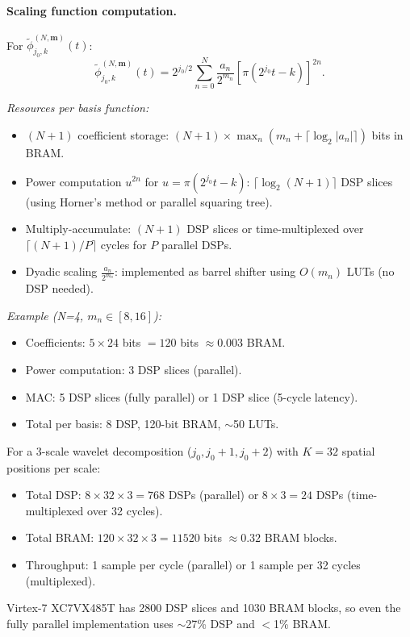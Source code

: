 \paragraph{Scaling function computation.} For $\widetilde{\phi}_{j_0,k}^{(N,\mathbf{m})}(t)$:
\[
\widetilde{\phi}_{j_0,k}^{(N,\mathbf{m})}(t) = 2^{j_0/2} \sum_{n=0}^{N} \frac{a_n}{2^{m_n}} \left[\pi(2^{j_0}t - k)\right]^{2n}.
\]

\emph{Resources per basis function:}
\begin{itemize}
\item $(N+1)$ coefficient storage: $(N+1) \times \max_n(m_n + \lceil \log_2 |a_n| \rceil)$ bits in BRAM.
\item Power computation $u^{2n}$ for $u = \pi(2^{j_0}t - k)$: $\lceil \log_2(N+1) \rceil$ DSP slices (using Horner's method or parallel squaring tree).
\item Multiply-accumulate: $(N+1)$ DSP slices or time-multiplexed over $\lceil (N+1)/P \rceil$ cycles for $P$ parallel DSPs.
\item Dyadic scaling $\frac{a_n}{2^{m_n}}$: implemented as barrel shifter using $O(m_n)$ LUTs (no DSP needed).
\end{itemize}

\emph{Example (N=4, $m_n \in [8, 16]$):}
\begin{itemize}
\item Coefficients: $5 \times 24$ bits $= 120$ bits $\approx 0.003$ BRAM.
\item Power computation: 3 DSP slices (parallel).
\item MAC: 5 DSP slices (fully parallel) or 1 DSP slice (5-cycle latency).
\item Total per basis: 8 DSP, 120-bit BRAM, $\sim$50 LUTs.
\end{itemize}

For a 3-scale wavelet decomposition ($j_0, j_0+1, j_0+2$) with $K=32$ spatial positions per scale:
\begin{itemize}
\item Total DSP: $8 \times 32 \times 3 = 768$ DSPs (parallel) or $8 \times 3 = 24$ DSPs (time-multiplexed over 32 cycles).
\item Total BRAM: $120 \times 32 \times 3 = 11520$ bits $\approx 0.32$ BRAM blocks.
\item Throughput: 1 sample per cycle (parallel) or 1 sample per 32 cycles (multiplexed).
\end{itemize}

Virtex-7 XC7VX485T has 2800 DSP slices and 1030 BRAM blocks, so even the fully parallel implementation uses $\sim$27\% DSP and $<$1\% BRAM.

